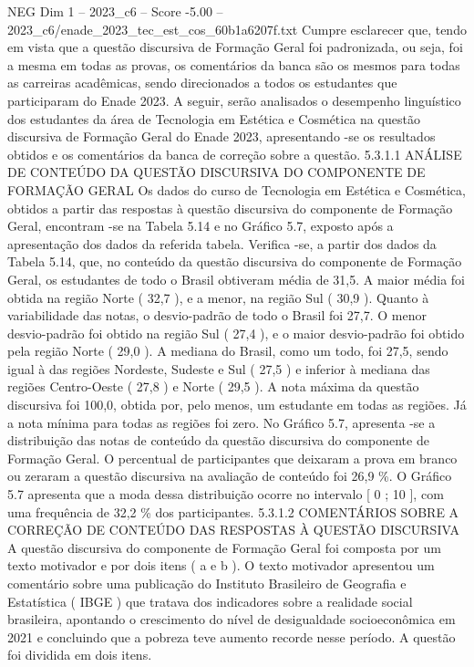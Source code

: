 \begin{textsample}{NEG Dim 1 – 2023\_c6 – Score -5.00 – 2023\_c6/enade\_2023\_tec\_est\_cos\_60b1a6207f.txt}
Cumpre esclarecer que, tendo em vista que a questão discursiva de Formação Geral foi padronizada, ou seja, foi a mesma em todas as provas, os comentários da banca são os mesmos para todas as carreiras acadêmicas, sendo direcionados a todos os estudantes que participaram do Enade 2023.
A seguir, serão analisados o desempenho linguístico dos estudantes da área de Tecnologia em Estética e Cosmética na questão discursiva de Formação Geral do Enade 2023, apresentando -se os resultados obtidos e os comentários da banca de correção sobre a questão. 5.3.1.1 ANÁLISE DE CONTEÚDO DA QUESTÃO DISCURSIVA DO COMPONENTE DE FORMAÇÃO GERAL Os dados do curso de Tecnologia em Estética e Cosmética, obtidos a partir das respostas à questão discursiva do componente de Formação Geral, encontram -se na Tabela 5.14 e no Gráfico 5.7, exposto após a apresentação dos dados da referida tabela.
Verifica -se, a partir dos dados da Tabela 5.14, que, no conteúdo da questão discursiva do componente de Formação Geral, os estudantes de todo o Brasil obtiveram média de 31,5.
A maior média foi obtida na região Norte ( 32,7 ), e a menor, na região Sul ( 30,9 ).
Quanto à variabilidade das notas, o desvio-padrão de todo o Brasil foi 27,7.
O menor desvio-padrão foi obtido na região Sul ( 27,4 ), e o maior desvio-padrão foi obtido pela região Norte ( 29,0 ).
A mediana do Brasil, como um todo, foi 27,5, sendo igual à das regiões Nordeste, Sudeste e Sul ( 27,5 ) e inferior à mediana das regiões Centro-Oeste ( 27,8 ) e Norte ( 29,5 ).
A nota máxima da questão discursiva foi 100,0, obtida por, pelo menos, um estudante em todas as regiões.
Já a nota mínima para todas as regiões foi zero.
No Gráfico 5.7, apresenta -se a distribuição das notas de conteúdo da questão discursiva do componente de Formação Geral.
O percentual de participantes que deixaram a prova em branco ou zeraram a questão discursiva na avaliação de conteúdo foi 26,9 \%.
O Gráfico 5.7 apresenta que a moda dessa distribuição ocorre no intervalo [ 0 ; 10 ], com uma frequência de 32,2 \% dos participantes. 5.3.1.2 COMENTÁRIOS SOBRE A CORREÇÃO DE CONTEÚDO DAS RESPOSTAS À QUESTÃO DISCURSIVA A questão discursiva do componente de Formação Geral foi composta por um texto motivador e por dois itens ( a e b ).
O texto motivador apresentou um comentário sobre uma publicação do Instituto Brasileiro de Geografia e Estatística ( IBGE ) que tratava dos indicadores sobre a realidade social brasileira, apontando o crescimento do nível de desigualdade socioeconômica em 2021 e concluindo que a pobreza teve aumento recorde nesse período.
A questão foi dividida em dois itens.

\end{textsample}
